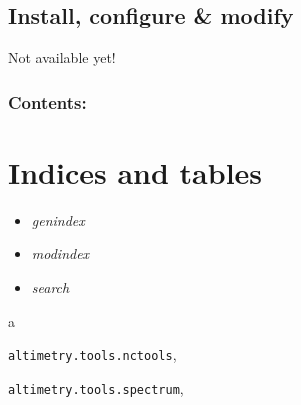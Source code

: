 \documentclass[letterpaper,10pt,english]{sphinxmanual}
\begin{document}
\section{Install, configure \& modify}
\label{Install:install-configure-modify}\label{Install::doc}
Not available yet!


\subsection{Contents:}
\label{Install:contents}

\chapter{Indices and tables}
\label{index:indices-and-tables}\begin{itemize}
\item {} 
\emph{genindex}

\item {} 
\emph{modindex}

\item {} 
\emph{search}

\end{itemize}


\renewcommand{\indexname}{Python Module Index}
\begin{theindex}
\def\bigletter#1{{\Large\sffamily#1}\nopagebreak\vspace{1mm}}
\bigletter{a}
\item {\texttt{altimetry.tools.nctools}}, \pageref{altimetry.tools.nctools:module-altimetry.tools.nctools}
\item {\texttt{altimetry.tools.spectrum}}, \pageref{altimetry.tools.spectrum:module-altimetry.tools.spectrum}
\end{theindex}

\renewcommand{\indexname}{Index}
\printindex
\end{document}
